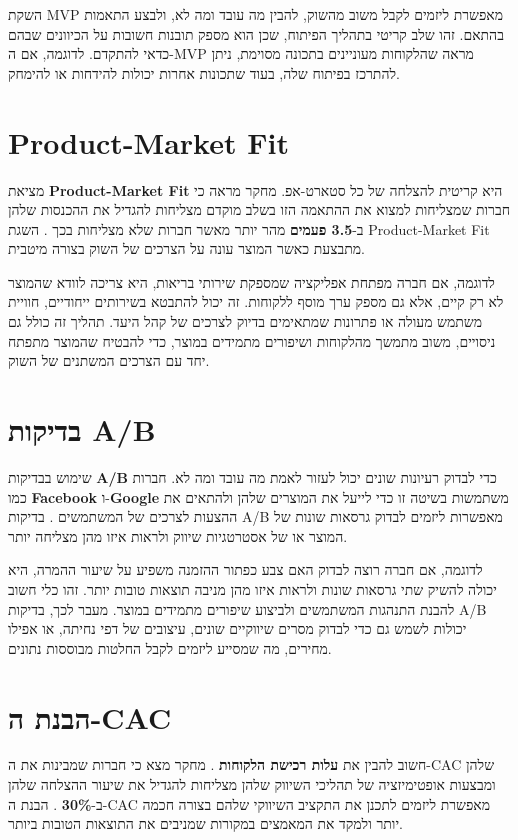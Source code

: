 השקת MVP מאפשרת ליזמים לקבל משוב מהשוק, להבין מה עובד ומה לא, ולבצע התאמות בהתאם. זהו שלב קריטי בתהליך הפיתוח, שכן הוא מספק תובנות חשובות על הכיוונים שבהם כדאי להתקדם. לדוגמה, אם ה-MVP מראה שהלקוחות מעוניינים בתכונה מסוימת, ניתן להתרכז בפיתוח שלה, בעוד שתכונות אחרות יכולות להידחות או להימחק.

\section{Product-Market Fit}
מציאת \textbf{Product-Market Fit} היא קריטית להצלחה של כל סטארט-אפ. מחקר מראה כי חברות שמצליחות למצוא את ההתאמה הזו בשלב מוקדם מצליחות להגדיל את ההכנסות שלהן ב-\textbf{3.5 פעמים} מהר יותר מאשר חברות שלא מצליחות בכך \cite{andreessen2007product}. השגת Product-Market Fit מתבצעת כאשר המוצר עונה על הצרכים של השוק בצורה מיטבית.

לדוגמה, אם חברה מפתחת אפליקציה שמספקת שירותי בריאות, היא צריכה לוודא שהמוצר לא רק קיים, אלא גם מספק ערך מוסף ללקוחות. זה יכול להתבטא בשירותים ייחודיים, חוויית משתמש מעולה או פתרונות שמתאימים בדיוק לצרכים של קהל היעד. תהליך זה כולל גם ניסויים, משוב מתמשך מהלקוחות ושיפורים מתמידים במוצר, כדי להבטיח שהמוצר מתפתח יחד עם הצרכים המשתנים של השוק.

\section{בדיקות A/B}
שימוש בבדיקות \textbf{A/B} כדי לבדוק רעיונות שונים יכול לעזור לאמת מה עובד ומה לא. חברות כמו \textbf{Facebook} ו-\textbf{Google} משתמשות בשיטה זו כדי לייעל את המוצרים שלהן ולהתאים את ההצעות לצרכים של המשתמשים \cite{fader2013customer}. בדיקות A/B מאפשרות ליזמים לבדוק גרסאות שונות של המוצר או של אסטרטגיות שיווק ולראות איזו מהן מצליחה יותר.

לדוגמה, אם חברה רוצה לבדוק האם צבע כפתור ההזמנה משפיע על שיעור ההמרה, היא יכולה להשיק שתי גרסאות שונות ולראות איזו מהן מניבה תוצאות טובות יותר. זהו כלי חשוב להבנת התנהגות המשתמשים ולביצוע שיפורים מתמידים במוצר. מעבר לכך, בדיקות A/B יכולות לשמש גם כדי לבדוק מסרים שיווקיים שונים, עיצובים של דפי נחיתה, או אפילו מחירים, מה שמסייע ליזמים לקבל החלטות מבוססות נתונים.

\section{הבנת ה-CAC \texorpdfstring{}{(Customer Acquisition Cost)}}
חשוב להבין את \textbf{עלות רכישת הלקוחות} . מחקר מצא כי חברות שמבינות את ה-CAC שלהן ומבצעות אופטימיזציה של תהליכי השיווק שלהן מצליחות להגדיל את שיעור ההצלחה שלהן ב-\textbf{30\%} \cite{patterson2019customer}. הבנת ה-CAC מאפשרת ליזמים לתכנן את התקציב השיווקי שלהם בצורה חכמה יותר ולמקד את המאמצים במקורות שמניבים את התוצאות הטובות ביותר.

